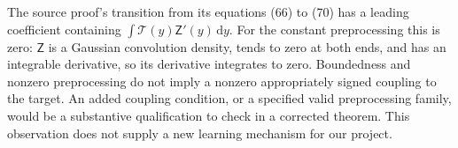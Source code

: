 The source proof's transition from its equations (66) to (70) has a
leading coefficient containing
$\int\mathcal T(y)\mathsf Z'(y)\,\mathrm dy$.
For the constant preprocessing this is zero: $\mathsf Z$ is a Gaussian
convolution density, tends to zero at both ends, and has an integrable
derivative, so its derivative integrates to zero. Boundedness and
nonzero preprocessing do not imply a nonzero appropriately signed
coupling to the target. An added coupling condition, or a specified
valid preprocessing family, would be a substantive qualification to
check in a corrected theorem. This observation does not supply a new
learning mechanism for our project.
